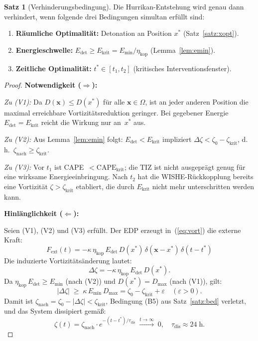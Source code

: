 ﻿\documentclass[a4paper,12pt]{article}
\theoremstyle{definition}
\newtheorem{satz}{Satz}
\begin{document}
\begin{satz}[Verhinderungsbedingung]
\label{satz:vhb}
Die Hurrikan-Entstehung wird genau dann verhindert, wenn folgende drei
Bedingungen simultan erf\"{u}llt sind:
\begin{enumerate}
    \item[(V1)] \textbf{R\"{a}umliche Optimalit\"{a}t:}
          Detonation an Position $x^{*}$ (Satz~\ref{satz:xopt}).
    \item[(V2)] \textbf{Energieschwelle:}
          $E_{\mathrm{det}}\geq E_{\mathrm{krit}}=E_{\min}/\eta_{\mathrm{kop}}$
          (Lemma~\ref{lem:emin}).
    \item[(V3)] \textbf{Zeitliche Optimalit\"{a}t:}
          $t^{*}\in[t_{1},t_{2}]$ (kritisches Interventionsfenster).
\end{enumerate}
\end{satz}

\begin{proof}
\textbf{Notwendigkeit ($\Rightarrow$):}

\emph{Zu (V1):} Da $D(\mathbf{x})\leq D(x^{*})$ f\"{u}r alle $\mathbf{x}\in\Omega$,
ist an jeder anderen Position die maximal erreichbare Vortizit\"{a}tsreduktion
geringer.
Bei gegebener Energie $E_{\mathrm{det}}=E_{\mathrm{krit}}$ reicht die Wirkung
nur an~$x^{*}$ aus.

\emph{Zu (V2):} Aus Lemma~\ref{lem:emin} folgt:
$E_{\mathrm{det}}<E_{\mathrm{krit}}$ impliziert
$\Delta\zeta<\zeta_{0}-\zeta_{\mathrm{krit}}$,
d.\,h.\ $\zeta_{\mathrm{nach}}\geq\zeta_{\mathrm{krit}}$.

\emph{Zu (V3):} Vor $t_{1}$ ist CAPE~$<\mathrm{CAPE}_{\mathrm{krit}}$;
die TIZ ist nicht ausgepr\"{a}gt genug f\"{u}r eine wirksame Energieeinbringung.
Nach $t_{2}$ hat die WISHE-R\"{u}ckkopplung bereits eine Vortizit\"{a}t
$\zeta>\zeta_{\mathrm{krit}}$ etabliert, die durch $E_{\mathrm{krit}}$
nicht mehr unterschritten werden kann.

\textbf{Hinl\"{a}nglichkeit ($\Leftarrow$):}

Seien (V1), (V2) und (V3) erf\"{u}llt.
Der EDP erzeugt in~(\ref{eq:vort}) die externe Kraft:
\[
    F_{\mathrm{ext}}(t)
    =-\kappa\,\eta_{\mathrm{kop}}\,E_{\mathrm{det}}\,D(x^{*})\,
    \delta(\mathbf{x}-x^{*})\,\delta(t-t^{*})
\]
Die induzierte Vortizit\"{a}ts\"{a}nderung lautet:
\[
    \Delta\zeta = -\kappa\,\eta_{\mathrm{kop}}\,E_{\mathrm{det}}\,D(x^{*}).
\]
Da $\eta_{\mathrm{kop}}\,E_{\mathrm{det}}\geq E_{\min}$ (nach (V2)) und
$D(x^{*})=D_{\max}$ (nach (V1)), gilt:
\[
    |\Delta\zeta|\;\geq\;\kappa\,E_{\min}\,D_{\max}
    = \zeta_{0}-\zeta_{\mathrm{krit}}+\varepsilon \quad(\varepsilon>0).
\]
Damit ist $\zeta_{\mathrm{nach}}=\zeta_{0}-|\Delta\zeta|<\zeta_{\mathrm{krit}}$,
Bedingung (B5) aus Satz~\ref{satz:bed} verletzt, und
das System dissipiert gem\"{a}\ss{}:
\[
    \zeta(t)=\zeta_{\mathrm{nach}}\cdot e^{-(t-t^{*})/\tau_{\mathrm{dis}}}
    \;\xrightarrow{t\to\infty}\;0,
    \quad\tau_{\mathrm{dis}}\approx 24\;\mathrm{h}.
\]
\end{proof}
\end{document}
